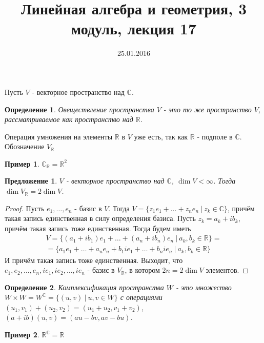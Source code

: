 \documentclass[a4paper,12pt]{article}
\author{}
\title{Линейная алгебра и геометрия, 3 модуль, лекция 17}
\date{25.01.2016}
\newtheorem*{Def}{Определение}
\newtheorem*{Suggestion}{Предложение}
\newtheorem*{Examples}{Пример}
\begin{document}
\maketitle
Пусть $V$ - векторное пространство над $\mathbb{C}$.
\begin{Def}
Овеществление пространства $V$ - это то же пространство $V$, рассматриваемое как пространство над $\mathbb{R}$.
\end{Def}
Операция умножения на элементы $\mathbb{R}$ в $V$ уже есть, так как $\mathbb{R}$ - подполе в $\mathbb{C}$. Обозначение $V_\mathbb{R}$

\begin{Examples}
$\mathbb{C}_\mathbb{R} = \mathbb{R}^2$
\end{Examples}
\begin{Suggestion}
$V$ - векторное пространство над $\mathbb{C}$, $\dim V < \infty$. Тогда $\dim V_\mathbb{R} = 2\dim V$.
\end{Suggestion}
\begin{proof}
Пусть $e_1, \ldots, e_n$ - базис в $V$. Тогда $V = \{z_1e_1 + \ldots + z_ne_n\ |\ z_k \in \mathbb{C}\}$, причём такая запись единственная в силу определения базиса. Пусть $z_k = a_k+ib_k$, причём такая запись тоже единственная. Тогда будем иметь
\begin{gather*}
V = \{ \left(a_1+ib_1\right)e_1 + \ldots + \left(a_n+ib_n\right)e_n\ |\ a_k, b_k \in \mathbb{R}\} =\\
= \{a_1e_1 + \ldots + a_ne_n + b_1ie_1 + \ldots + b_nie_n\ |\ a_k, b_k \in \mathbb{R}\}
\end{gather*}
И причём такая запись тоже единственная. Выходит, что $e_1, e_2, \ldots, e_n, ie_1, ie_2, \ldots, ie_n$ - базис в $V_\mathbb{R}$, в котором $2n = 2\dim V$ элементов.
\end{proof}
\begin{Def}
Комплексификация пространства $W$ - это множество $W\times W = W^\mathbb{C} = \{\left( u, v\right)\ |\ u,v \in W\}$ с операциями $\left(u_1, v_1\right) + \left(u_2, v_2\right) = \left(u_1+u_2, v_1+v_2\right)$, $\left(a+ib\right)\left(u, v\right) = \left(au-bv, av-bu\right)$.
\end{Def}
\begin{Examples}
$\mathbb{R}^\mathbb{C} = \mathbb{R}$
\end{Examples}
\end{document}
